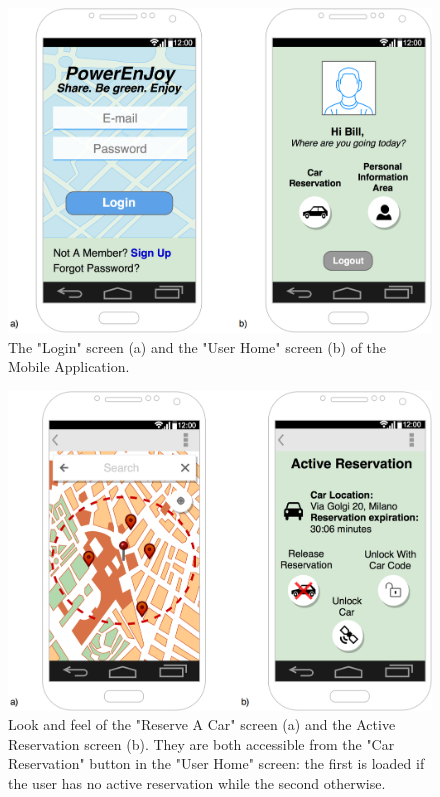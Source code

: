 \begin{figure}[H]
\centering
		\includegraphics[width=\textwidth]{./user_interface_design/diagrams/mobile_login_home.png}
		\caption{The "Login" screen (a) and the "User Home" screen (b) of the Mobile Application.}
		\label{mobile_login_home}
\end{figure}

\begin{figure}[H]
\centering
		\includegraphics[width=\textwidth]{./user_interface_design/diagrams/mobile_res_unlock.png}
		\caption{Look and feel of the "Reserve A Car" screen (a) and the Active Reservation screen (b). They are both accessible from the "Car Reservation" button in the "User Home" screen: the first is loaded if the user has no active reservation while the second otherwise.}
		\label{mobile_res_unlock}
\end{figure}

